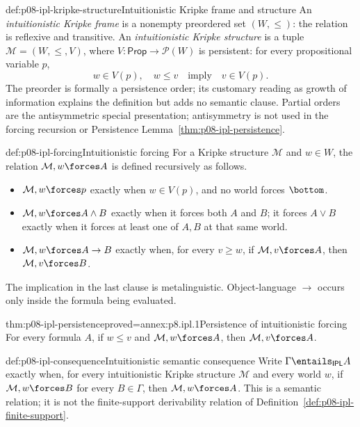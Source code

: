 \begin{hbdefinition}{def:p08-ipl-kripke-structure}{Intuitionistic Kripke frame and structure}
An \emph{intuitionistic Kripke frame} is a nonempty preordered set
\((W,\leq)\): the relation is reflexive and transitive.  An
\emph{intuitionistic Kripke structure} is a tuple
\(\mathcal M=(W,\leq,V)\), where
\(V:\mathsf{Prop}\to\mathcal P(W)\) is persistent: for every propositional
variable \(p\),
\[
  w\in V(p),\quad w\leq v
  \quad\text{imply}\quad
  v\in V(p).
\]
The preorder is formally a persistence order; its customary reading as growth
of information explains the definition but adds no semantic clause.  Partial
orders are the antisymmetric special presentation; antisymmetry is not used in
the forcing recursion or Persistence Lemma~\ref{thm:p08-ipl-persistence}.
\end{hbdefinition}

\begin{hbdefinition}{def:p08-ipl-forcing}{Intuitionistic forcing}
For a Kripke structure \(\mathcal M\) and \(w\in W\), the relation
\(\mathcal M,w\forces A\) is defined recursively as follows.
\begin{itemize}
\item \(\mathcal M,w\forces p\) exactly when \(w\in V(p)\), and no world
  forces \(\bottom\).
\item \(\mathcal M,w\forces A\land B\) exactly when it forces both \(A\)
  and \(B\); it forces \(A\lor B\) exactly when it forces at least one of
  \(A,B\) at that same world.
\item \(\mathcal M,w\forces A\to B\) exactly when, for every \(v\geq w\),
  if \(\mathcal M,v\forces A\), then \(\mathcal M,v\forces B\).
\end{itemize}
The implication in the last clause is metalinguistic.  Object-language
\(\to\) occurs only inside the formula being evaluated.
\end{hbdefinition}

\begin{hblemma}{thm:p08-ipl-persistence}{proved=annex:p8.ipl.1}{Persistence of intuitionistic forcing}
For every formula \(A\), if \(w\leq v\) and
\(\mathcal M,w\forces A\), then \(\mathcal M,v\forces A\).
\end{hblemma}

\begin{hbdefinition}{def:p08-ipl-consequence}{Intuitionistic semantic consequence}
Write \(\Gamma\entails_{\mathsf{IPL}}A\) exactly when, for every
intuitionistic Kripke structure \(\mathcal M\) and every world \(w\), if
\(\mathcal M,w\forces B\) for every \(B\in\Gamma\), then
\(\mathcal M,w\forces A\).  This is a semantic relation; it is not the
finite-support derivability relation of
Definition~\ref{def:p08-ipl-finite-support}.
\end{hbdefinition}

